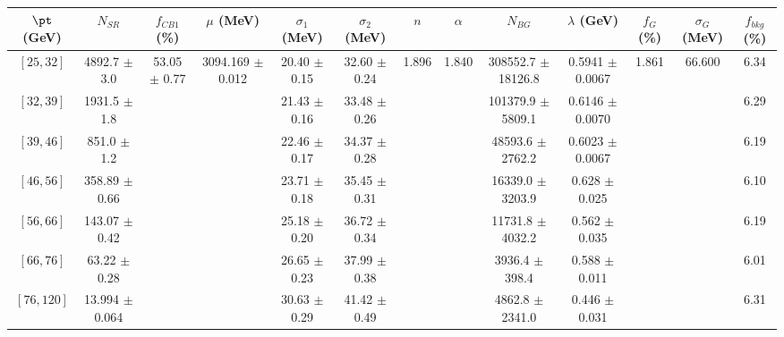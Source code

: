 \begin{tabular}{c||c|c|c|c|c|c|c|c|c|c|c||c}
$\pt$ (GeV) & $N_{SR}$ & $f_{CB1}$ (\%) & $\mu$ (MeV) & $\sigma_1$ (MeV) & $\sigma_2$ (MeV) & $n$ & $\alpha$ & $N_{BG}$ & $\lambda$ (GeV) & $f_G$ (\%) & $\sigma_G$ (MeV) & $f_{bkg}$ (\%) \\
\hline
$[25, 32]$ & 4892.7 $\pm$ 3.0 & \multirow{7}{*}{53.05 $\pm$ 0.77} & \multirow{7}{*}{3094.169 $\pm$ 0.012} & 20.40 $\pm$ 0.15 & 32.60 $\pm$ 0.24 & \multirow{7}{*}{1.896} & \multirow{7}{*}{1.840} & 308552.7 $\pm$ 18126.8 & 0.5941 $\pm$ 0.0067 & \multirow{7}{*}{1.861} & \multirow{7}{*}{66.600} & 6.34\\
$[32, 39]$ & 1931.5 $\pm$ 1.8 &  &  & 21.43 $\pm$ 0.16 & 33.48 $\pm$ 0.26 &  &  & 101379.9 $\pm$ 5809.1 & 0.6146 $\pm$ 0.0070 &  &  & 6.29\\
$[39, 46]$ & 851.0 $\pm$ 1.2 &  &  & 22.46 $\pm$ 0.17 & 34.37 $\pm$ 0.28 &  &  & 48593.6 $\pm$ 2762.2 & 0.6023 $\pm$ 0.0067 &  &  & 6.19\\
$[46, 56]$ & 358.89 $\pm$ 0.66 &  &  & 23.71 $\pm$ 0.18 & 35.45 $\pm$ 0.31 &  &  & 16339.0 $\pm$ 3203.9 & 0.628 $\pm$ 0.025 &  &  & 6.10\\
$[56, 66]$ & 143.07 $\pm$ 0.42 &  &  & 25.18 $\pm$ 0.20 & 36.72 $\pm$ 0.34 &  &  & 11731.8 $\pm$ 4032.2 & 0.562 $\pm$ 0.035 &  &  & 6.19\\
$[66, 76]$ & 63.22 $\pm$ 0.28 &  &  & 26.65 $\pm$ 0.23 & 37.99 $\pm$ 0.38 &  &  & 3936.4 $\pm$ 398.4 & 0.588 $\pm$ 0.011 &  &  & 6.01\\
$[76, 120]$ & 13.994 $\pm$ 0.064 &  &  & 30.63 $\pm$ 0.29 & 41.42 $\pm$ 0.49 &  &  & 4862.8 $\pm$ 2341.0 & 0.446 $\pm$ 0.031 &  &  & 6.31\\
\end{tabular}
